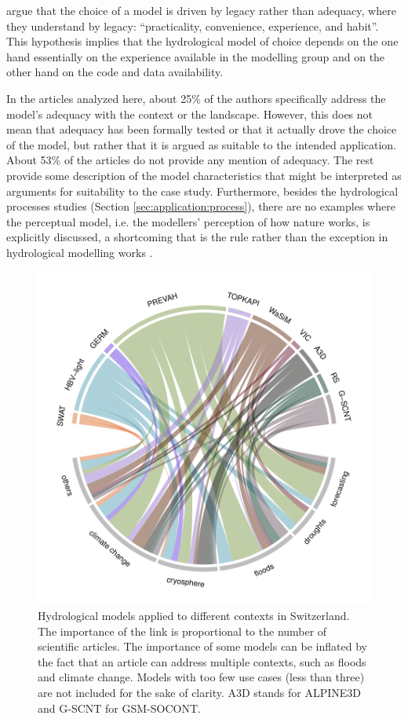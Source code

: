 \documentclass[10pt,a4paper]{article}
\begin{document}
\citet{Addor_2019} argue that the choice of a model is driven by legacy rather than adequacy, where they understand by legacy: ``practicality, convenience, experience, and habit''. This hypothesis implies that the hydrological model of choice depends on the one hand essentially on the experience available in the modelling group and on the other hand on the code and data availability. 

In the articles analyzed here, about 25\% of the authors specifically address the model's adequacy with the context or the landscape. However, this does not mean that adequacy has been formally tested or that it actually drove the choice of the model, but rather that it is argued as suitable to the intended application. About 53\% of the articles do not provide any mention of adequacy. The rest provide some description of the model characteristics that might be interpreted as arguments for suitability to the case study. Furthermore, besides the hydrological processes studies (Section \ref{sec:application:process}), there are no examples where the perceptual model, i.e. the modellers' perception of how nature works, is explicitly discussed, a shortcoming that is the rule rather than the exception in hydrological modelling works \citep{beven2021}.

\begin{figure}[htb]
	\begin{center}
		\includegraphics[width=0.70\columnwidth]{figures/chord_diagram}
		\caption{{Hydrological models applied to different contexts in Switzerland. The
				importance of the link is proportional to the number of scientific
				articles. The importance of some models can be inflated by the fact that
				an article can address multiple contexts, such as floods and climate
				change. Models with too few use cases (less than three) are not included
				for the sake of clarity. A3D stands for ALPINE3D and G-SCNT for
				GSM-SOCONT.
				{\label{fig:applications}}
		}}
	\end{center}
\end{figure}
\end{document}
